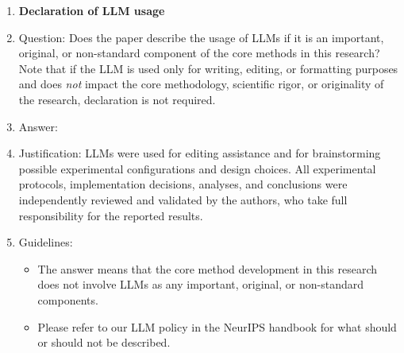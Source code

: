 \documentclass{article}
\begin{document}
\begin{enumerate}
\item {\bf Declaration of LLM usage}
    \item[] Question: Does the paper describe the usage of LLMs if it is an important, original, or non-standard component of the core methods in this research? Note that if the LLM is used only for writing, editing, or formatting purposes and does \emph{not} impact the core methodology, scientific rigor, or originality of the research, declaration is not required.
    \item[] Answer: \answerYes{} %
    \item[] Justification: LLMs were used for editing assistance and for brainstorming possible experimental configurations and design choices. All experimental protocols, implementation decisions, analyses, and conclusions were independently reviewed and validated by the authors, who take full responsibility for the reported results.
    \item[] Guidelines:
    \begin{itemize}
        \item The answer \answerNA{} means that the core method development in this research does not involve LLMs as any important, original, or non-standard components.
        \item Please refer to our LLM policy in the NeurIPS handbook for what should or should not be described.
    \end{itemize}

\end{enumerate}
\end{document}
